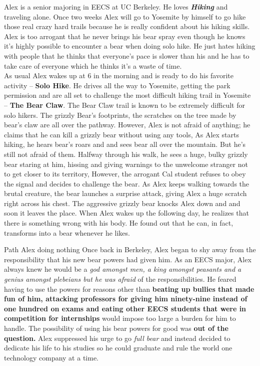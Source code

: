 \documentclass{article}
\begin{document}
Alex is a senior majoring in EECS at UC Berkeley. He loves \textbf{\textit{Hiking}} and traveling alone. Once two weeks Alex will go to Yosemite by himself to go hike those real crazy hard trails because he is really confident about his hiking skills. Alex is too arrogant that he never brings his bear spray even though he knows it’s highly possible to encounter a bear when doing solo hike. He just hates hiking with people that he thinks that everyone’s pace is slower than his and he has to take care of everyone which he thinks it's a waste of time. \\
\newline
	\indent As usual Alex wakes up at 6 in the morning and is ready to do his favorite activity -- \textbf{Solo Hike}. He drives all the way to Yosemite, getting the park permission and are all set to challenge the most difficult hiking trail in Yosemite -- \textbf{The Bear Claw}. The Bear Claw trail is known to be extremely difficult for solo hikers. The grizzly Bear’s footprints, the scratches on the tree made by bear’s claw are all over the pathway. However, Alex is not afraid of anything; he claims that he can kill a grizzly bear without using any tools, As Alex starts hiking, he hears bear’s roars and and sees bear all over the mountain. But he’s still not afraid of them. Halfway through his walk, he sees a huge, bulky grizzly bear staring at him, hissing and giving warnings to the unwelcome stranger not to get closer to its territory, However, the arrogant Cal student refuses to obey the signal and decides to challenge the bear. As Alex keeps walking towards the brutal creature, the bear launches a surprise attack, giving Alex a huge scratch right across his chest. The aggressive grizzly bear knocks Alex down and and soon it leaves the place. When Alex wakes up the following day, he realizes that there is something wrong with his body. He found out that he can, in fact, transforms into a bear whenever he likes.

Path Alex doing nothing
Once back in Berkeley, Alex began to shy away from the responsibility that his new bear powers had given him. As an EECS major, Alex always knew he would be a \textit {god amongst \emph {men}, a king amongst \emph {peasants} and a genius amongst \emph {plebeians} but he was afraid} of the responsibilities. He feared having to use the powers for reasons other than \textbf {beating up bullies that made fun of him, attacking professors for giving him ninety-nine instead of one hundred on exams and eating other EECS students that were in competition for internships} would impose too large a burden for him to handle. The possibility of using his bear powers for good was \textbf {out of the question.} Alex suppressed his urge to go \textit {full bear} and instead decided to dedicate his life to his studies so he could graduate and rule the world one technology company at a time. 
\end{document}

